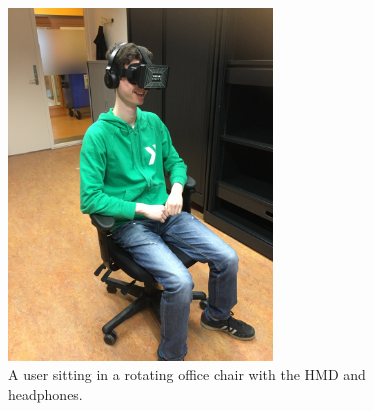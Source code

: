 \documentclass[a4paper]{article}
\begin{document}
\begin{figure}
\centering
\includegraphics[width=7cm]{Part2Setup}
\caption{A user sitting in a rotating office chair with the HMD and headphones.}
\label{fig:part2Setup}
\end{figure}





\end{document}
